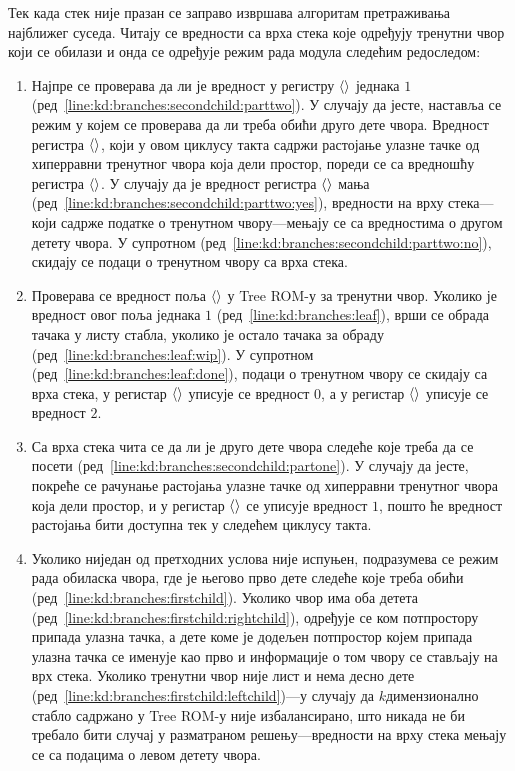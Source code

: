 \documentclass[master]{finthesis}
\newcommand*{\kdim}[1]{\texorpdfstring{$k$\Hyphdash}{k-}димензионал#1}
\newcommand*{\correctmath}[1]{%
    \ifcsname mathCorrectionFor#1\endcsname%
        \csname mathCorrectionFor#1\endcsname%
    \else%
        #1%
    \fi%
}
\newcommand*{\mfield}[1]{{\langle\correctmath{#1}\/\rangle}}
\newcommand*{\field}[1]{\texorpdfstring{$\mfield{#1}$}{⟨#1⟩}}
\begin{document}
Тек када стек није празан се заправо извршава алгоритам претраживања најближег суседа. Читају се вредности са врха стека које одређују тренутни чвор који се обилази и онда се одређује режим рада модула следећим редоследом:
\begin{enumerate}
    \item Најпре се проверава да ли је вредност у регистру \field{calcMedianDist} једнака $1$ (ред~\ref{line:kd:branches:secondchild:parttwo}). У случају да јесте, наставља се режим у којем се проверава да ли треба обићи друго дете чвора. Вредност регистра \field{medianDist}, који у овом циклусу такта садржи растојање улазне тачке од хиперравни тренутног чвора која дели простор, пореди се са вредношћу регистра \field{closestPointDist}. У случају да је вредност регистра \field{medianDist} мања (ред~\ref{line:kd:branches:secondchild:parttwo:yes}), вредности на врху стека---који садрже податке о тренутном чвору---мењају се са вредностима о другом детету чвора. У супротном (ред~\ref{line:kd:branches:secondchild:parttwo:no}), скидају се подаци о тренутном чвору са врха стека.
    
    \item Проверава се вредност поља \field{leaf} у Tree ROM-у за тренутни чвор. Уколико је вредност овог поља једнака $1$ (ред~\ref{line:kd:branches:leaf}), врши се обрада тачака у листу стабла, уколико је остало тачака за обраду (ред~\ref{line:kd:branches:leaf:wip}). У супротном (ред~\ref{line:kd:branches:leaf:done}), подаци о тренутном чвору се скидају са врха стека, у регистар \field{iterPointsVisited} уписује се вредност $0$, а у регистар \field{closestPointDelay} уписује се вредност $2$.
    
    \item Са врха стека чита се да ли је друго дете чвора следеће које треба да се посети (ред~\ref{line:kd:branches:secondchild:partone}). У случају да јесте, покреће се рачунање растојања улазне тачке од хиперравни тренутног чвора која дели простор, и у регистар \field{calcMedianDist} се уписује вредност $1$, пошто ће вредност растојања бити доступна тек у следећем циклусу такта.

    \item Уколико ниједан од претходних услова није испуњен, подразумева се режим рада обиласка чвора, где је његово прво дете следеће које треба обићи (ред~\ref{line:kd:branches:firstchild}). Уколико чвор има оба детета (ред~\ref{line:kd:branches:firstchild:rightchild}), одређује се ком потпростору припада улазна тачка, а дете коме је додељен потпростор којем припада улазна тачка се именује као прво и информације о том чвору се стављају на врх стека. Уколико тренутни чвор није лист и нема десно дете (ред~\ref{line:kd:branches:firstchild:leftchild})---у случају да \kdim{но} стабло садржано у Tree ROM-у није избалансирано, што никада не би требало бити случај у разматраном решењу---вредности на врху стека мењају се са подацима о левом детету чвора.
\end{enumerate}
\end{document}
